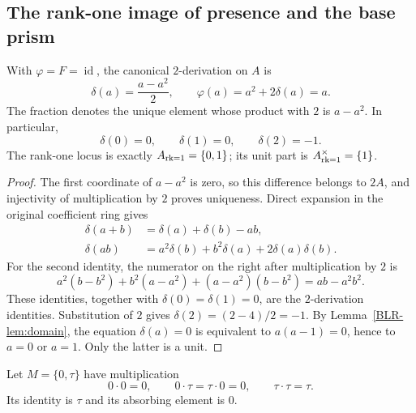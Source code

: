 \subsection{The rank-one image of presence and the base prism}
\begin{proposition}\label{BLR-prop:delta}
With $\varphi=F=\operatorname{id}$, the canonical $2$-derivation on $A$ is
\begin{equation}\label{BLR-eq:delta-full}
 \delta(a)=\frac{a-a^2}{2},\qquad
 \varphi(a)=a^2+2\delta(a)=a.
\end{equation}
The fraction denotes the unique element whose product with $2$ is
$a-a^2$. In particular,
\[
 \delta(0)=0,\qquad\delta(1)=0,\qquad\delta(2)=-1.
\]
The rank-one locus is exactly $A_{\mathrm{rk}=1}=\{0,1\}$; its unit part is
$A^\times_{\mathrm{rk}=1}=\{1\}$.
\end{proposition}
\begin{proof}
The first coordinate of $a-a^2$ is zero, so this difference belongs to
$2A$, and injectivity of multiplication by $2$ proves uniqueness.
Direct expansion in the original coefficient ring gives
\begin{align*}
 \delta(a+b)&=\delta(a)+\delta(b)-ab,\\
 \delta(ab)&=a^2\delta(b)+b^2\delta(a)
                    +2\delta(a)\delta(b).
\end{align*}
For the second identity, the numerator on the right after multiplication
by $2$ is
\[
 a^2(b-b^2)+b^2(a-a^2)+(a-a^2)(b-b^2)=ab-a^2b^2.
\]
These identities, together with $\delta(0)=\delta(1)=0$, are the
$2$-derivation identities. Substitution of $2$ gives
$\delta(2)=(2-4)/2=-1$. By Lemma~\ref{BLR-lem:domain}, the equation
$\delta(a)=0$ is equivalent to $a(a-1)=0$, hence to $a=0$ or $a=1$.
Only the latter is a unit.
\end{proof}

\begin{definition}\label{BLR-def:presence-monoid}
Let $M=\{0,\tau\}$ have multiplication
\[
 0\cdot0=0,\qquad0\cdot\tau=\tau\cdot0=0,\qquad
 \tau\cdot\tau=\tau.
\]
Its identity is $\tau$ and its absorbing element is $0$.
\end{definition}

